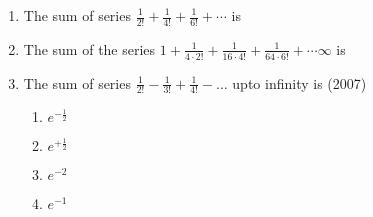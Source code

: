 \begin{enumerate}[label=\thesubsection.\arabic*,ref=\thesubsection.\theenumi]
\item {The sum of series $\frac{1}{2!}+\frac{1}{4!}+\frac{1}{6!}+\cdots$ is}
{\hfill{}} 
\begin{enumerate}
\end{enumerate}

\item {The sum of the series $1+\frac{1}{4\cdot2!}+\frac{1}{16\cdot4!}+\frac{1}{64\cdot6!}+\cdots  \infty$ is}
{\hfill{}} 
\begin{enumerate}
\end{enumerate}

    \item The sum of series $\frac{1}{2!}-\frac{1}{3!}+\frac{1}{4!}-\dots$ upto infinity is 
    \hfill(2007)

    \begin{enumerate}
    \item$e^{-\frac{1}{2}}$
    \item$e^{+\frac{1}{2}}$
    \item$e^{-2}$
    \item$e^{-1}$
    \end{enumerate}

\end{enumerate}
